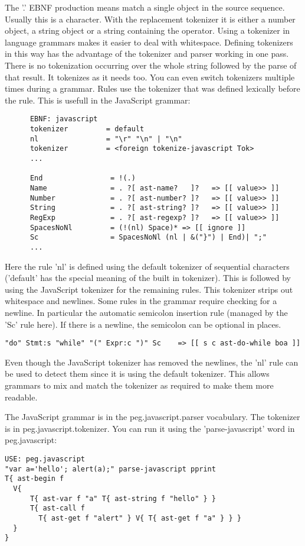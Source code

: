 \begin{itemize}
      The '.' EBNF production means match a single object in the
      source sequence. Usually this is a character. With the
      replacement tokenizer it is either a number object, a string
      object or a string containing the operator. Using a tokenizer in
      language grammars makes it easier to deal with
      whitespace. Defining tokenizers in this way has the advantage of
      the tokenizer and parser working in one pass. There is no
      tokenization occurring over the whole string followed by the
      parse of that result. It tokenizes as it needs too. You can even
      switch tokenizers multiple times during a grammar. Rules use the
      tokenizer that was defined lexically before the rule. This is
      usefull in the JavaScript grammar:
\begin{verbatim}
      EBNF: javascript
      tokenizer         = default 
      nl                = "\r" "\n" | "\n"
      tokenizer         = <foreign tokenize-javascript Tok>
      ...

      End                = !(.)
      Name               = . ?[ ast-name?   ]?   => [[ value>> ]] 
      Number             = . ?[ ast-number? ]?   => [[ value>> ]]
      String             = . ?[ ast-string? ]?   => [[ value>> ]]
      RegExp             = . ?[ ast-regexp? ]?   => [[ value>> ]]
      SpacesNoNl         = (!(nl) Space)* => [[ ignore ]]
      Sc                 = SpacesNoNl (nl | &("}") | End)| ";"
      ...
\end{verbatim}
      Here the rule 'nl' is defined using the default tokenizer of
      sequential characters ('default' has the special meaning of the
      built in tokenizer). This is followed by using the JavaScript
      tokenizer for the remaining rules. This tokenizer strips out
      whitespace and newlines. Some rules in the grammar require
      checking for a newline. In particular the automatic semicolon
      insertion rule (managed by the 'Sc' rule here). If there is a
      newline, the semicolon can be optional in places.
\begin{verbatim}
"do" Stmt:s "while" "(" Expr:c ")" Sc    => [[ s c ast-do-while boa ]]
\end{verbatim}

      Even though the JavaScript tokenizer has removed the newlines,
      the 'nl' rule can be used to detect them since it is using the
      default tokenizer. This allows grammars to mix and match the
      tokenizer as required to make them more readable.
\end{itemize}

The JavaScript grammar is in the peg.javascript.parser vocabulary. The
tokenizer is in peg.javascript.tokenizer. You can run it using the
'parse-javascript' word in peg.javascript:
\begin{verbatim}
USE: peg.javascript
"var a='hello'; alert(a);" parse-javascript pprint
T{ ast-begin f
  V{
      T{ ast-var f "a" T{ ast-string f "hello" } }
      T{ ast-call f
        T{ ast-get f "alert" } V{ T{ ast-get f "a" } } }
  }
}
\end{verbatim}

